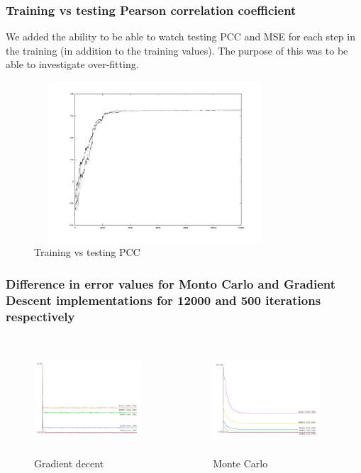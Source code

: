\documentclass[presentation]{beamer}   %
\begin{document}
\begin{frame}
\frametitle{Training vs testing Pearson correlation coefficient}
We added the ability to be able to watch testing PCC and MSE for each step in the training (in addition to the training values). The purpose of this was to be able to investigate over-fitting.
		\begin{figure}
		\centering
			\includegraphics[width=90mm,height=60mm]{fig/pcc2.pdf}
			\caption{Training vs testing PCC}
		\end{figure}
\end{frame}

\begin{frame}
\frametitle{Difference in error values for Monto Carlo and Gradient Descent implementations for 12000 and 500 iterations respectively}
\begin{columns}[t] %
		\begin{figure}
		\centering
			\includegraphics[width=40mm,height=40mm]{fig/smm_error.png}
			\caption{Gradient decent}
		\end{figure}
		\begin{figure}
			\centering
			\includegraphics[width=40mm,height=40mm]{fig/smm_mc_error.png}
			\caption{Monte Carlo}
		\end{figure}
  \end{columns}
\end{frame}
\end{document}
